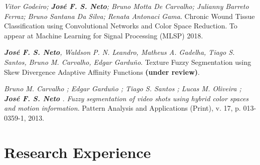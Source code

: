 \documentclass[letterpaper]{article}
\renewenvironment{itemize}{
  \begin{list}{}{
      \setlength{\leftmargin}{1.5em}
    }
  }{
  \end{list}
}
\begin{document}
\begin{itemize}

  \item \textit{Vitor Godeiro; \textbf{Jos\'e F. S. Neto}; Bruno Motta De Carvalho; Julianny Barreto Ferraz; Bruno Santana Da Silva; Renata Antonaci Gama}. Chronic Wound Tissue Classification using Convolutional Networks and Color Space Reduction. To appear at Machine Learning for Signal Processing (MLSP) 2018.

  \item \textit{\textbf{Jos\'e F. S. Neto}, Waldson P. N. Leandro, Matheus A. Gadelha, Tiago S. Santos, Bruno M. Carvalho, Edgar Gardu\~no}. Texture Fuzzy Segmentation using Skew Divergence Adaptive Affinity Functions \textbf{(under review)}.

  \item \textit{Bruno M. Carvalho ; Edgar Gardu\~no ; Tiago S. Santos ; Lucas M. Oliveira ; \textbf{Jos\'e F. S. Neto} . Fuzzy segmentation of video shots using hybrid color spaces and motion
  information}. Pattern Analysis and Applications (Print), v. 17, p. 013-0359-1, 2013. \\

\end{itemize}

\section*{Research Experience}
\end{document}
